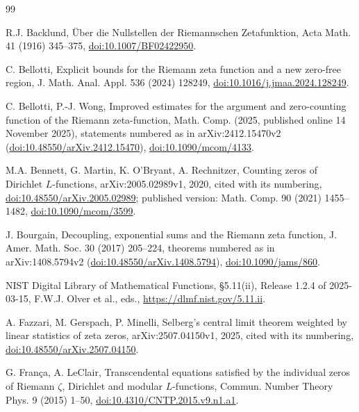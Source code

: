 \documentclass[11pt,a4paper]{article}
\numberwithin{equation}{section}
\theoremstyle{definition}
\theoremstyle{remark}
\begin{document}
\begin{thebibliography}{99}

 R.J. Backlund, \"Uber die Nullstellen der Riemannschen Zetafunktion, Acta Math. 41 (1916) 345--375, \href{https://doi.org/10.1007/BF02422950}{doi:10.1007/BF02422950}.

 C. Bellotti, Explicit bounds for the Riemann zeta function and a new zero-free region, J. Math. Anal. Appl. 536 (2024) 128249, \href{https://doi.org/10.1016/j.jmaa.2024.128249}{doi:10.1016/j.jmaa.2024.128249}.

 C. Bellotti, P.-J. Wong, Improved estimates for the argument and zero-counting function of the Riemann zeta-function, Math. Comp. (2025, published online 14 November 2025), statements numbered as in arXiv:2412.15470v2 (\href{https://doi.org/10.48550/arXiv.2412.15470}{doi:10.48550/arXiv.2412.15470}), \href{https://doi.org/10.1090/mcom/4133}{doi:10.1090/mcom/4133}.

 M.A. Bennett, G. Martin, K. O'Bryant, A. Rechnitzer, Counting zeros of Dirichlet $L$-functions, arXiv:2005.02989v1, 2020, cited with its numbering, \href{https://doi.org/10.48550/arXiv.2005.02989}{doi:10.48550/arXiv.2005.02989}; published version: Math. Comp. 90 (2021) 1455--1482, \href{https://doi.org/10.1090/mcom/3599}{doi:10.1090/mcom/3599}.

 J. Bourgain, Decoupling, exponential sums and the Riemann zeta function, J. Amer. Math. Soc. 30 (2017) 205--224, theorems numbered as in arXiv:1408.5794v2 (\href{https://doi.org/10.48550/arXiv.1408.5794}{doi:10.48550/arXiv.1408.5794}), \href{https://doi.org/10.1090/jams/860}{doi:10.1090/jams/860}.

 NIST Digital Library of Mathematical Functions, \S5.11(ii), Release 1.2.4 of 2025-03-15, F.W.J. Olver et al., eds., \url{https://dlmf.nist.gov/5.11.ii}.

 A. Fazzari, M. Gerspach, P. Minelli, Selberg's central limit theorem weighted by linear statistics of zeta zeros, arXiv:2507.04150v1, 2025, cited with its numbering, \href{https://doi.org/10.48550/arXiv.2507.04150}{doi:10.48550/arXiv.2507.04150}.

 G. Fran\c{c}a, A. LeClair, Transcendental equations satisfied by the individual zeros of Riemann $\zeta$, Dirichlet and modular $L$-functions, Commun. Number Theory Phys. 9 (2015) 1--50, \href{https://doi.org/10.4310/CNTP.2015.v9.n1.a1}{doi:10.4310/CNTP.2015.v9.n1.a1}.


\end{thebibliography}
\end{document}
